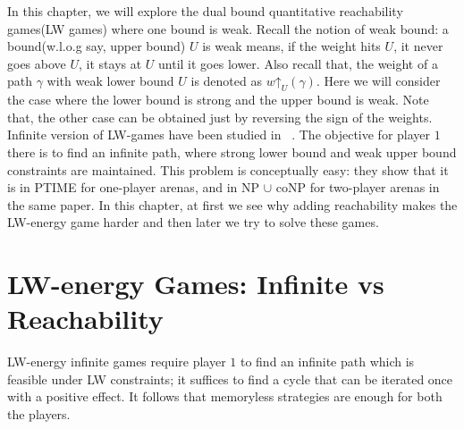 In this chapter, we will explore the dual bound quantitative reachability games(LW games) where one bound is weak. Recall the notion of weak bound: a bound(w.l.o.g say, upper bound) $U$ is weak means, if the weight hits $U$, it never goes above $U$, it stays at $U$ until it goes lower. Also recall that, the weight of a path $\gamma$ with weak lower bound $U$ is denoted as $w\mathord{\uparrow}_{U}(\gamma)$. Here we will consider the case where the lower bound is strong and the upper bound is weak. Note that, the other case can be obtained just by reversing the sign of the weights. Infinite version of LW-games have been studied in ~\cite{BouyerFLMS08}. The objective for player $1$ there is to find an infinite path, where strong lower bound and weak upper bound constraints are maintained. This problem is conceptually easy: they show that it is in PTIME for one-player arenas, and in NP $\cup$ coNP for two-player arenas in the same paper. In this chapter, at first we see why adding reachability makes the LW-energy game harder and then later we try to solve these games.\\

\section{LW-energy Games: Infinite vs Reachability}

LW-energy infinite games require player $1$ to find an infinite path which is feasible under LW constraints; it suffices to find a cycle that can be iterated once with a positive effect. It follows that memoryless strategies are enough for both the players.\\

